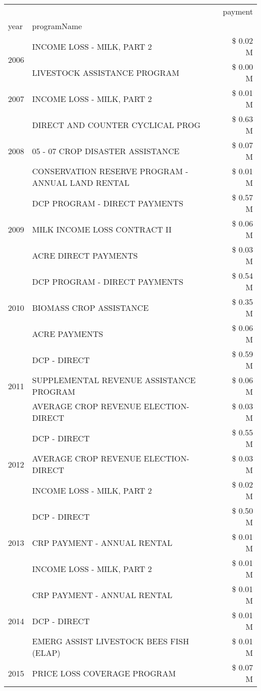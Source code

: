 \begin{tabular}{llr}
\toprule
 &  & payment \\
year & programName &  \\
\midrule
\multirow[t]{2}{*}{2006} & INCOME LOSS - MILK, PART 2 & \$ 0.02 M \\
 & LIVESTOCK ASSISTANCE PROGRAM & \$ 0.00 M \\
\cline{1-3}
2007 & INCOME LOSS - MILK, PART 2 & \$ 0.01 M \\
\cline{1-3}
\multirow[t]{3}{*}{2008} & DIRECT AND COUNTER CYCLICAL PROG & \$ 0.63 M \\
 & 05 - 07 CROP DISASTER ASSISTANCE & \$ 0.07 M \\
 & CONSERVATION RESERVE PROGRAM - ANNUAL LAND RENTAL & \$ 0.01 M \\
\cline{1-3}
\multirow[t]{3}{*}{2009} & DCP PROGRAM - DIRECT PAYMENTS & \$ 0.57 M \\
 & MILK INCOME LOSS CONTRACT II & \$ 0.06 M \\
 & ACRE DIRECT PAYMENTS & \$ 0.03 M \\
\cline{1-3}
\multirow[t]{3}{*}{2010} & DCP PROGRAM - DIRECT PAYMENTS & \$ 0.54 M \\
 & BIOMASS CROP ASSISTANCE & \$ 0.35 M \\
 & ACRE PAYMENTS & \$ 0.06 M \\
\cline{1-3}
\multirow[t]{3}{*}{2011} & DCP - DIRECT & \$ 0.59 M \\
 & SUPPLEMENTAL REVENUE ASSISTANCE PROGRAM & \$ 0.06 M \\
 & AVERAGE CROP REVENUE ELECTION-DIRECT & \$ 0.03 M \\
\cline{1-3}
\multirow[t]{3}{*}{2012} & DCP - DIRECT & \$ 0.55 M \\
 & AVERAGE CROP REVENUE ELECTION-DIRECT & \$ 0.03 M \\
 & INCOME LOSS - MILK, PART 2 & \$ 0.02 M \\
\cline{1-3}
\multirow[t]{3}{*}{2013} & DCP - DIRECT & \$ 0.50 M \\
 & CRP PAYMENT - ANNUAL RENTAL & \$ 0.01 M \\
 & INCOME LOSS - MILK, PART 2 & \$ 0.01 M \\
\cline{1-3}
\multirow[t]{3}{*}{2014} & CRP PAYMENT - ANNUAL RENTAL & \$ 0.01 M \\
 & DCP - DIRECT & \$ 0.01 M \\
 & EMERG ASSIST LIVESTOCK BEES FISH (ELAP) & \$ 0.01 M \\
\cline{1-3}
\multirow[t]{3}{*}{2015} & PRICE LOSS COVERAGE PROGRAM & \$ 0.07 M \\

\end{tabular}
